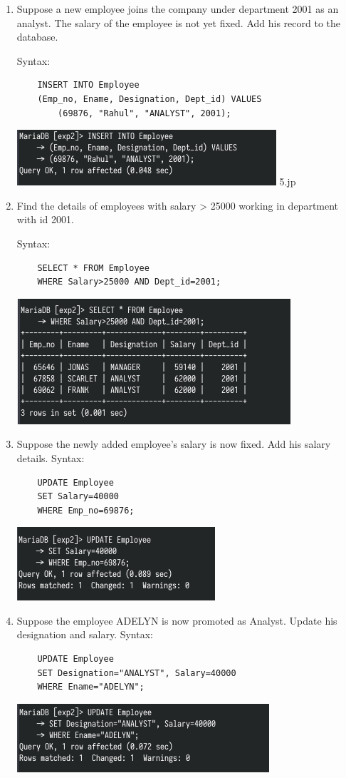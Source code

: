 \documentclass[13pt,oneside]{book}
\begin{document}
\begin{enumerate}
		\item
		Suppose a new employee joins the company under department 2001 as
	an analyst. The salary of the employee is not yet fixed. Add his record to
	the database.
	
		Syntax:
		\begin{verbatim}
	INSERT INTO Employee
	(Emp_no, Ename, Designation, Dept_id) VALUES
		(69876, "Rahul", "ANALYST", 2001);
		\end{verbatim}
		\includegraphics[]{img/p2/ss5.png}
		5.jp
	\item
	Find the details of employees with salary > 25000 working in department
	with id 2001.
	
	Syntax:
	\begin{verbatim}
	SELECT * FROM Employee
	WHERE Salary>25000 AND Dept_id=2001;
	\end{verbatim}
	\includegraphics[]{img/p2/ss6.png}
	
	\item
			Suppose the newly added employee's salary is now fixed. Add his salary
	details.
			Syntax: 
			\begin{verbatim}
	UPDATE Employee
	SET Salary=40000
	WHERE Emp_no=69876;
			\end{verbatim}
			\includegraphics{img/p2/ss7.png}
			
		\item
		Suppose the employee ADELYN is now promoted as Analyst. Update his
	designation and salary.
	Syntax:
		\begin{verbatim}
	UPDATE Employee
	SET Designation="ANALYST", Salary=40000
	WHERE Ename="ADELYN";
		\end{verbatim}
		\includegraphics[]{img/p2/ss8.png}
		

\end{enumerate}
\end{document}
